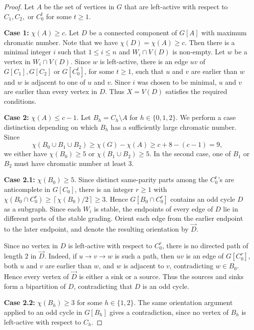 \documentclass{article}
\begin{document}
\begin{proof}
    Let $A$ be the set of vertices in $G$ that are left-active with respect to $C_1, C_2,$ or $C_0^t$ for some $t \geq 1$. 

    \textbf{Case 1:} $\chi(A) \geq c$.
    Let $D$ be a connected component of $G[A]$ with maximum chromatic number. Note that we have $\chi(D) = \chi(A) \geq c$. Then there is a minimal integer $i$ such that $1 \leq i \leq n$ and $W_i \cap V(D)$ is non-empty. Let $w$ be a vertex in $W_i \cap V(D)$. Since $w$ is left-active, there is an edge $uv$ of $G[C_1], G[C_2]$ or $G[C_0^t]$, for some $t \geq 1$, such that $u$ and $v$ are earlier than $w$ and $w$ is adjacent to one of $u$ and $v$. Since $i$ was chosen to be minimal, $u$ and $v$ are earlier than every vertex in $D$. Thus $X = V(D)$ satisfies the required conditions.

    \textbf{Case 2:} $\chi(A) \leq c - 1$.
    Let $B_h = C_h \setminus A$ for $h \in \{0, 1, 2\}$. We perform a case distinction depending on which $B_h$ has a sufficiently large chromatic number.
    Since 
    \[\chi(B_0 \cup B_1 \cup B_2) \geq \chi(G) - \chi(A) \geq c + 8 - (c -1) = 9,\]
    we either have $\chi(B_0) \geq 5$ or $\chi(B_1 \cup B_2) \geq 5$. In the second case, one of $B_1$ or $B_2$ must have chromatic number at least $3$.

    \textbf{Case 2.1:} $\chi(B_0) \geq 5$.
    Since distinct same-parity parts among the \(C_0^t\)'s are anticomplete in \(G[C_0]\), there is an integer $r \geq 1$ with $\chi(B_0 \cap C_0^{r}) \geq \left\lceil \chi(B_0) / 2 \right\rceil \geq 3$.
    Hence \(G[B_0 \cap C_0^r]\) contains an odd cycle \(D\) as a subgraph. Since each \(W_i\) is stable, the endpoints of every edge of \(D\) lie in different parts of the stable grading. Orient each edge from the earlier endpoint to the later endpoint, and denote the resulting orientation by \(\vec D\).

    Since no vertex in \(D\) is left-active with respect to \(C_0^r\), there is no directed path of length \(2\) in \(\vec D\). Indeed, if \(u \to v \to w\) is such a path, then \(uv\) is an edge of \(G[C_0^r]\), both \(u\) and \(v\) are earlier than \(w\), and \(w\) is adjacent to \(v\), contradicting \(w\in B_0\).
    Hence every vertex of \(\vec D\) is either a sink or a source. Thus the sources and sinks form a bipartition of \(D\), contradicting that \(D\) is an odd cycle. 

    \textbf{Case 2.2:} $\chi(B_h) \geq 3$ for some $h \in \{1, 2\}$.
    The same orientation argument applied to an odd cycle in \(G[B_h]\) gives a contradiction, since no vertex of \(B_h\) is left-active with respect to \(C_h\).
\end{proof}
\end{document}
